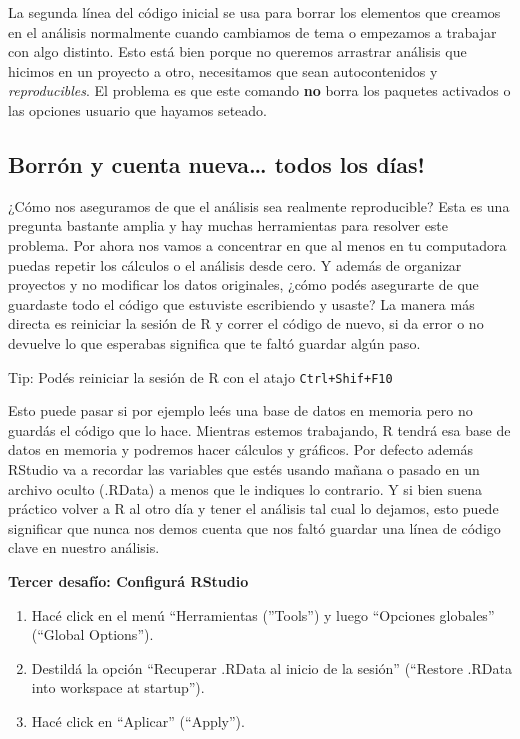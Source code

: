 \documentclass[
  openany]{book}
\providecommand{\tightlist}{%
  \setlength{\itemsep}{0pt}\setlength{\parskip}{0pt}}
\begin{document}
La segunda línea del código inicial se usa para borrar los elementos que creamos en el análisis normalmente cuando cambiamos de tema o empezamos a trabajar con algo distinto. Esto está bien porque no queremos arrastrar análisis que hicimos en un proyecto a otro, necesitamos que sean autocontenidos y \emph{reproducibles}. El problema es que este comando \textbf{no} borra los paquetes activados o las opciones usuario que hayamos seteado.

\hypertarget{borruxf3n-y-cuenta-nueva-todos-los-duxedas}{%
\subsection{Borrón y cuenta nueva\ldots{} todos los días!}\label{borruxf3n-y-cuenta-nueva-todos-los-duxedas}}

¿Cómo nos aseguramos de que el análisis sea realmente reproducible?
Esta es una pregunta bastante amplia y hay muchas herramientas para resolver este problema.
Por ahora nos vamos a concentrar en que al menos en tu computadora puedas repetir los cálculos o el análisis desde cero.
Y además de organizar proyectos y no modificar los datos originales, ¿cómo podés asegurarte de que guardaste todo el código que estuviste escribiendo y usaste?
La manera más directa es reiniciar la sesión de R y correr el código de nuevo, si da error o no devuelve lo que esperabas significa que te faltó guardar algún paso.

Tip: Podés reiniciar la sesión de R con el atajo \texttt{Ctrl+Shif+F10}

Esto puede pasar si por ejemplo leés una base de datos en memoria pero no guardás el código que lo hace.
Mientras estemos trabajando, R tendrá esa base de datos en memoria y podremos hacer cálculos y gráficos.
Por defecto además RStudio va a recordar las variables que estés usando mañana o pasado en un archivo oculto (.RData) a menos que le indiques lo contrario.
Y si bien suena práctico volver a R al otro día y tener el análisis tal cual lo dejamos, esto puede significar que nunca nos demos cuenta que nos faltó guardar una línea de código clave en nuestro análisis.

\textbf{Tercer desafío: Configurá RStudio}

\begin{enumerate}
\def\labelenumi{\arabic{enumi}.}
\tightlist
\item
  Hacé click en el menú ``Herramientas (''Tools'') y luego ``Opciones globales'' (``Global Options'').
\item
  Destildá la opción ``Recuperar .RData al inicio de la sesión'' (``Restore .RData into workspace at startup'').
\item
  Hacé click en ``Aplicar'' (``Apply'').
\end{enumerate}
\end{document}
